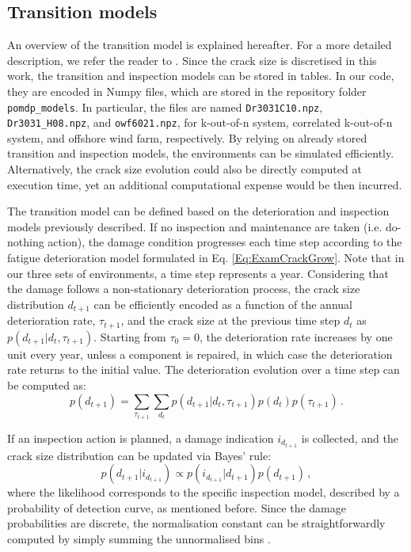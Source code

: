 \subsection{Transition models}
An overview of the transition model is explained hereafter.
For a more detailed description, we refer the reader to \citep{morato2022syst}.
Since the crack size is discretised in this work, the transition and inspection models can be stored in tables.
In our code, they are encoded in Numpy files, which are stored in the repository folder \texttt{pomdp\_models}.
In particular, the files are named \texttt{Dr3031C10.npz}, \texttt{Dr3031\_H08.npz}, and \texttt{owf6021.npz}, for k-out-of-n system, correlated k-out-of-n system, and offshore wind farm, respectively.
By relying on already stored transition and inspection models, the environments can be simulated efficiently.
Alternatively, the crack size evolution could also be directly computed at execution time, yet an additional computational expense would be then incurred.

The transition model can be defined based on the deterioration and inspection models previously described. 
If no inspection and maintenance are taken (i.e. do-nothing action), the damage condition progresses each time step according to the fatigue deterioration model formulated in Eq. \ref{Eq:ExamCrackGrow}.
Note that in our three sets of environments, a time step represents a year.
Considering that the damage follows a non-stationary deterioration process, the crack size distribution $d_{t+1}$ can be efficiently encoded as a function of the annual deterioration rate, $\tau_{t+1}$, and the crack size at the previous time step $d_{t}$ as $p(d_{t+1}|d_t,\tau_{t+1})$. 
Starting from $\tau_{0}=0$, the deterioration rate increases by one unit every year, unless a component is repaired, in which case the deterioration rate returns to the initial value. 
The deterioration evolution over a time step can be computed as:
\begin{equation} \label{eq:ex_pod2}
    p(d_{t+1}) =  \sum_{\tau_{t+1}} \sum_{d_t} p(d_{t+1}|d_t,\tau_{t+1}) p(d_{t}) p(\tau_{t+1}) \, .
\end{equation}

If an inspection action is planned, a damage indication $i_{d_{t+1}}$ is collected, and the crack size distribution can be updated via Bayes' rule:
\begin{equation} \label{eq:ex_pod3}
    p(d_{t+1}|i_{d_{t+1}}) \propto  p(i_{d_{t+1}}|d_{t+1}) p(d_{t+1}) \, ,
\end{equation}
where the likelihood corresponds to the specific inspection model, described by a probability of detection curve, as mentioned before.
Since the damage probabilities are discrete, the normalisation constant can be straightforwardly computed by simply summing the unnormalised bins \citep{morato2022optimal}.

